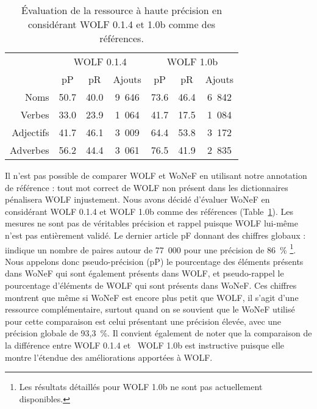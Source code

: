 \begin{table}[ht]
\centering
\begin{tabular}{rccc|ccc}
  \toprule
             & \multicolumn{3}{c}{WOLF 0.1.4}    & \multicolumn{3}{c}{WOLF 1.0b} \\
             &   pP      &    pR     & Ajouts    &     pP    &    pR    & Ajouts \\
  Noms       & 50.7     & 40.0     & 9~646     & 73.6     & 46.4    & 6~842  \\
  Verbes     & 33.0     & 23.9     & 1~064     & 41.7     & 17.5    & 1~084  \\
  Adjectifs  & 41.7     & 46.1     & 3~009     & 64.4     & 53.8    & 3~172  \\
  Adverbes   & 56.2     & 44.4     & 3~061     & 76.5     & 41.9    & 2~835  \\ 
  \bottomrule
\end{tabular}
\caption{\protect\centering\label{table:wolfcomparison}Évaluation de la ressource à haute précision en considérant WOLF 0.1.4 et 1.0b comme des références.}
\end{table}


Il n'est pas possible de comparer WOLF et WoNeF en utilisant notre annotation de référence : tout mot correct de WOLF non présent dans les dictionnaires pénalisera WOLF injustement. Nous avons décidé d'évaluer WoNeF en considérant WOLF 0.1.4 et WOLF 1.0b comme des références (Table~\ref{table:wolfcomparison}). Les mesures ne sont pas de véritables précision et rappel puisque WOLF lui-même n'est pas entièrement validé. Le dernier article pF donnant des chiffres globaux \citep{sagot2012automatic} : iindique un nombre de paires autour de 77~000 pour une précision de 86~\% \footnote{Les résultats détaillés pour WOLF 1.0b ne sont pas actuellement disponibles.}. Nous appelons donc pseudo-précision (pP) le pourcentage des éléments présents dans WoNeF qui sont également présents dans WOLF, et pseudo-rappel le pourcentage d'éléments de WOLF qui sont présents dans WoNeF. Ces chiffres montrent que même si WoNeF est encore plus petit que WOLF, il s'agit d'une ressource complémentaire, surtout quand on se souvient que le WoNeF utilisé pour cette comparaison est celui présentant une précision élevée, avec une précision globale de 93,3~\%. Il convient également de noter que la comparaison de la différence entre WOLF 0.1.4 et \ WOLF 1.0b est instructive puisque elle montre l'étendue des améliorations apportées à WOLF.

